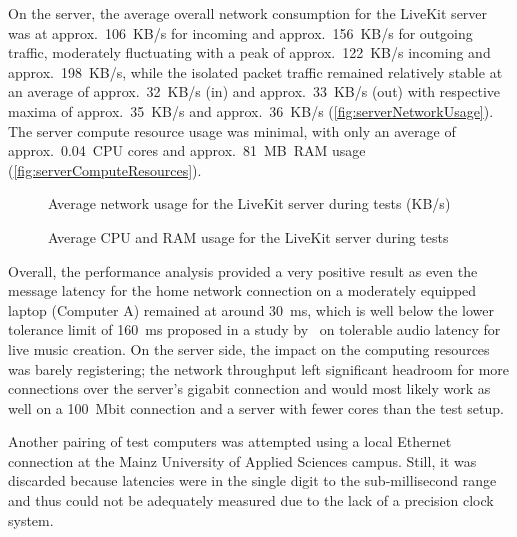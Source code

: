 On the server, the average overall network consumption for the LiveKit server was at approx.~106~\ac{KB/s} for incoming and approx.~156~KB/s for outgoing traffic, moderately fluctuating with a peak of approx.~122~\ac{KB/s} incoming and approx.~198~\ac{KB/s}, while the isolated packet traffic remained relatively stable at an average of approx.~32~\ac{KB/s} (in) and approx.~33~\ac{KB/s} (out) with respective maxima of approx.~35~\ac{KB/s} and approx.~36~\ac{KB/s} (\autoref{fig:serverNetworkUsage}).
The server compute resource usage was minimal, with only an average of approx.~0.04~\ac{CPU} cores and approx.~81~\ac{MB}~\ac{RAM} usage (\autoref{fig:serverComputeResources}).

\begin{figure*}[!ht]
\hfill

\caption[Server network usage during tests]{Average network usage for the LiveKit server during tests (\ac{KB/s})\protect}
\label{fig:serverNetworkUsage}
\end{figure*}

\begin{figure*}[!ht]
\hfill

\caption[Server compute resources usage during tests]{Average \ac{CPU} and \ac{RAM} usage for the LiveKit server during tests\protect}
\label{fig:serverComputeResources}
\end{figure*}

Overall, the performance analysis provided a very positive result as even the message latency for the home network connection on a moderately equipped laptop (Computer A) remained at around 30~\ac{ms}, which is well below the lower tolerance limit of 160~\ac{ms} proposed in a study by~\cite{audioLatency} on tolerable audio latency for live music creation.
On the server side, the impact on the computing resources was barely registering; the network throughput left significant headroom for more connections over the server's gigabit connection and would most likely work as well on a 100~\ac{Mbit} connection and a server with fewer cores than the test setup.

Another pairing of test computers was attempted using a local Ethernet connection at the Mainz University of Applied Sciences campus.
Still, it was discarded because latencies were in the single digit to the sub-millisecond range and thus could not be adequately measured due to the lack of a precision clock system.


